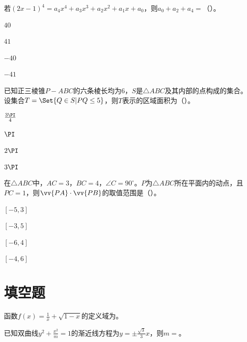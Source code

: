 \documentclass[fontset=founder]{ucedubook}
\let\pi=\PI
\let\vec=\vv
\begin{document}
\begin{ti}[.25]
  若$(2x-1)^4=a_4x^4+a_3x^3+a_2x^2+a_1x+a_0$，则$a_0+a_2+a_4=$（\qquad）。

  \begin{choices}
    \item $40$
    \item $41$
    \item $-40$
    \item $-41$
  \end{choices}
\end{ti}


\begin{ti}[.25]
  已知正三棱锥$P-ABC$的六条棱长均为$6$，$S$是$\triangle ABC$及其内部的点构成的集合。设集合$T=\Set{Q\in S|PQ\le 5}$，则$T$表示的区域面积为（\qquad）。

  \begin{choices}
    \item $\frac{3\pi}{4}$
    \item $\pi$
    \item $2\pi$
    \item $3\pi$
  \end{choices}
\end{ti}


\begin{ti}[.25]
  在$\triangle ABC$中，$AC=3$，$BC=4$，$\angle C=90^\circ$。$P$为$\triangle ABC$所在平面内的动点，且$PC=1$，则$\vec{PA}\cdot \vec{PB}$的取值范围是（\qquad）。

  \begin{choices}
    \item $\left[-5,3\right]$
    \item $\left[-3,5\right]$
    \item $\left[-6,4\right]$
    \item $\left[-4,6\right]$
  \end{choices}
\end{ti}


\newpageb
\section{填空题}

\begin{ti}[.2]
  函数$f(x)=\frac{1}{x}+\sqrt{1-x}$的定义域为\kong{}。
\end{ti}


\begin{ti}[.2]
  已知双曲线$y^2+\frac{x^2}{m}=1$的渐近线方程为$y=\pm \frac{\sqrt{3}}{3}x$，则$m=$\kong{}。
\end{ti}
\end{document}

